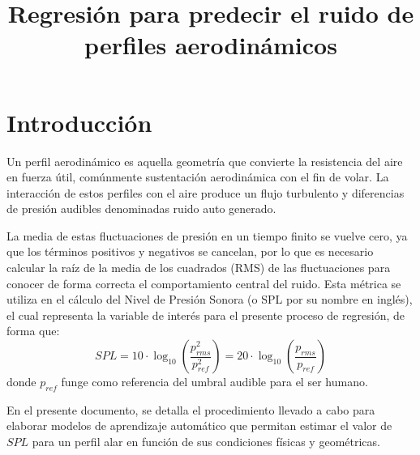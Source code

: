\documentclass[pdflatex,sn-mathphys-num]{sn-jnl}%
\theoremstyle{thmstyleone}
\theoremstyle{thmstyletwo}
\theoremstyle{thmstylethree}
\begin{document}
\title[Regresión para predecir el ruido de perfiles aerodinámicos]{Regresión para predecir el ruido de perfiles aerodinámicos}

\author[1]{ }
\author[2]{ }
\author[3]{ }
\author[4]{ }




\maketitle

\section{Introducción}\label{sec1}

Un perfil aerodinámico es aquella geometría que convierte la resistencia del aire en fuerza útil, comúnmente sustentación aerodinámica con el fin de volar. La interacción de estos perfiles con el aire produce un flujo turbulento y diferencias de presión audibles denominadas ruido auto generado.

La media de estas fluctuaciones de presión en un tiempo finito se vuelve cero, ya que los términos positivos y negativos se cancelan, por lo que es necesario calcular la raíz de la media de los cuadrados (RMS) de las fluctuaciones para conocer de forma correcta el comportamiento central del ruido. Esta métrica se utiliza en el cálculo del Nivel de Presión Sonora (o SPL por su nombre en inglés), el cual representa la variable de interés para el presente proceso de regresión, de forma que:
\begin{equation}
SPL = 10 \cdot \log_{10}\left( \frac{p^2_{rms}}{p^2_{ref}} \right)=20\cdot \log_{10}\left(\frac{p_{rms}}{p_{ref}}\right)
\end{equation}
donde $p_{ref}$ funge como referencia del umbral audible para el ser humano.

En el presente documento, se detalla el procedimiento llevado a cabo para elaborar modelos de aprendizaje automático que permitan estimar el valor de $SPL$ para un perfil alar en función de sus condiciones físicas y geométricas.
\end{document}
